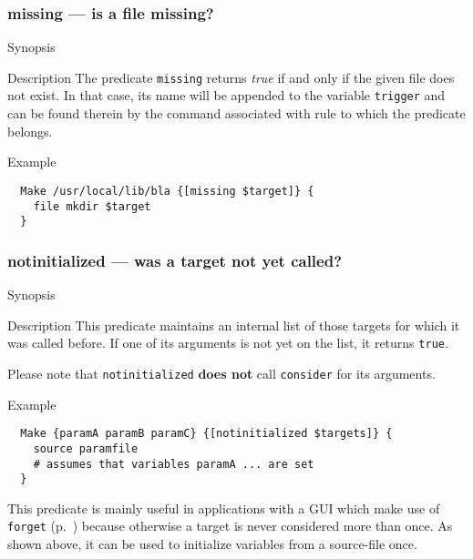 \documentclass[11pt]{scrartcl}
\begin{document}
\subsubsection{missing --- is a file missing?}
\begin{Describe}
\item[Synopsis]  
\item[Description] The predicate \texttt{missing} returns
  \textit{true} if and only if the given file does not exist. In that
  case, its name will be appended to the variable \texttt{trigger} and
  can be found therein by the command associated with rule to which
  the predicate belongs.
\item[Example]
\begin{verbatim}
  Make /usr/local/lib/bla {[missing $target]} { 
    file mkdir $target
  }
\end{verbatim}
\end{Describe}

\subsubsection{notinitialized --- was a target not yet called?}
\label{pred:notinitialized}
\begin{Describe}
\item[Synopsis]  
\item[Description] This predicate maintains an internal list of those
  targets for which it was called before. If one of its arguments is
  not yet on the list, it returns \texttt{true}.
  
  Please note that \texttt{notinitialized} \textbf{does not} call
  \texttt{consider} for its arguments.
\item[Example]
\begin{verbatim}
  Make {paramA paramB paramC} {[notinitialized $targets]} {
    source paramfile    
    # assumes that variables paramA ... are set 
  }
\end{verbatim} 
  This predicate is mainly useful in applications with a GUI which
  make use of \texttt{forget} (p.~\pageref{proc:forget}) because
  otherwise a target is never considered more than once. As shown
  above, it can be used to initialize variables from a source-file once.
\end{Describe}
\end{document}

